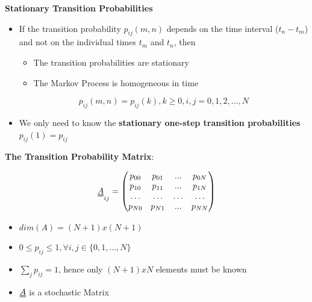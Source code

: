 \documentclass[8pt, landscape, fleqn]{scrartcl}
\begin{document}
\begin{multicols*}{3}
\textbf{Stationary Transition Probabilities}

\begin{itemize}
    \item If the transition probability $p_{ij}(m,n)$ depends on the time interval ($t_n-t_m$) and not on the individual times $t_m$ and $t_n$, then
    \begin{itemize}
        \item The transition probabilities are stationary 
        \item The Markov Process is homogeneous in time 
    \end{itemize} \begin{equation}
        p_{ij}(m,n) = p_{ij}(k), k\geq 0, i,j=0,1,2,...,N
    \end{equation}
    \item We only need to know the \textbf{stationary one-step transition probabilities} $p_{ij}(1) = p_{ij}$
\end{itemize}

\textbf{The Transition Probability Matrix}:

\begin{equation}
    \uuline{A}_{ij} = \begin{pmatrix}
        p_{00} & p_{01} & ... & p_{0N} \\
        p_{10} & p_{11} & ... & p_{1N} \\
        \dots   & \dots & \dots & \dots \\
        p_{N0} & p_{N1} & ... & p_{NN}
    \end{pmatrix}
\end{equation}

\begin{itemize}
    \item $dim(A) = (N+1) x (N+1)$
    \item $0 \leq p_{ij} \leq 1, \forall i, j \in \{0,1,...,N\}$
    \item $\sum_j p_{ij} = 1$, hence only $(N+1)xN$ elements must be known 
    \item $\uuline{A}$ is a stochastic Matrix 
\end{itemize}



\end{multicols*}
\end{document}
